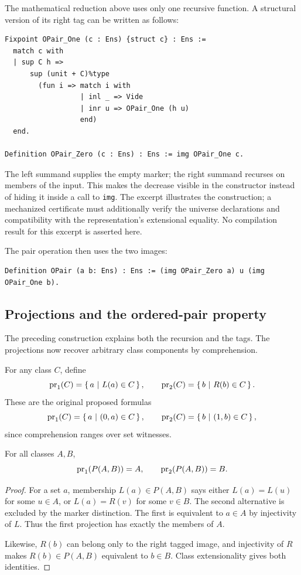 The mathematical reduction above uses only one recursive function. A
structural version of its right tag can be written as follows:
\begin{lstlisting}
Fixpoint OPair_One (c : Ens) {struct c} : Ens :=
  match c with
  | sup C h =>
      sup (unit + C)%type
        (fun i => match i with
                  | inl _ => Vide
                  | inr u => OPair_One (h u)
                  end)
  end.

Definition OPair_Zero (c : Ens) : Ens := img OPair_One c.
\end{lstlisting}
The left summand supplies the empty marker; the right summand recurses
on members of the input. This makes the decrease visible in the constructor
instead of hiding it inside a call to \texttt{img}. The excerpt illustrates
the construction; a mechanized certificate must additionally verify the
universe declarations and compatibility with the representation's
extensional equality. No compilation result for this excerpt is asserted
here.

The pair operation then uses the two images:
\begin{lstlisting}
Definition OPair (a b: Ens) : Ens := (img OPair_Zero a) u (img OPair_One b).
\end{lstlisting}

\subsection{Projections and the ordered-pair property}
The preceding construction explains both the recursion and the tags.
The projections now recover arbitrary class components by comprehension.

\begin{definition}
For any class $C$, define
\[
\mathrm{pr}_1(C)=\left\{\,a\ \middle|\ L(a)\in C\,\right\},\qquad
\mathrm{pr}_2(C)=\left\{\,b\ \middle|\ R(b)\in C\,\right\}.
\label{def:recursive_pair_projections}
\]
These are the original proposed formulas
\[
\mathrm{pr}_1(C)=\left\{\,a\ \middle|\ (0,a)\in C\,\right\},\qquad
\mathrm{pr}_2(C)=\left\{\,b\ \middle|\ (1,b)\in C\,\right\},
\]
since comprehension ranges over set witnesses.
\end{definition}

\begin{theorem}
For all classes $A,B$,
\[
\mathrm{pr}_1(P(A,B))=A,\qquad\mathrm{pr}_2(P(A,B))=B.
\label{thm:recursive_pair_projections}
\]
\end{theorem}
\begin{proof}
For a set $a$, membership $L(a)\in P(A,B)$ says either
$L(a)=L(u)$ for some $u\in A$, or $L(a)=R(v)$ for some $v\in B$.
The second alternative is excluded by the marker distinction. The first
is equivalent to $a\in A$ by injectivity of $L$. Thus the first projection
has exactly the members of $A$.

Likewise, $R(b)$ can belong only to the right tagged image, and injectivity
of $R$ makes $R(b)\in P(A,B)$ equivalent to $b\in B$. Class
extensionality gives both identities.
\end{proof}

